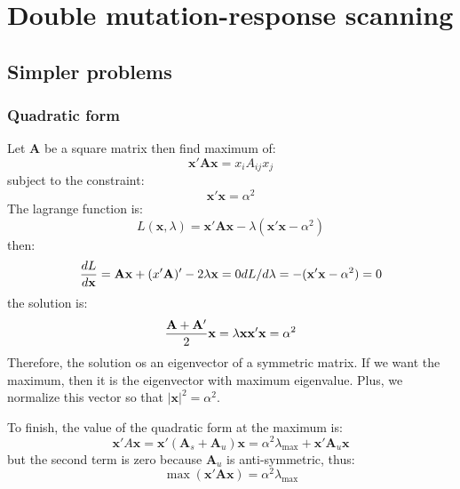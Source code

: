 \documentclass[
]{article}
\author{}
\date{\vspace{-2.5em}}
\begin{document}
\hypertarget{double-mutation-response-scanning}{%
\section{Double mutation-response
scanning}\label{double-mutation-response-scanning}}

\usepackage{amsmath}

\renewcommand{\[}{\begin{equation}}
\renewcommand{\]}{\end{equation}}

\newcommand{\fvec}{\mathbf{f}}
\newcommand{\evec}{\mathbf{e}}
\newcommand{\avec}{\mathbf{a}}
\newcommand{\amat}{\mathbf{A}}
\newcommand{\umat}{\mathbf{U}}
\newcommand{\kmat}{\mathbf{K}}
\newcommand{\cmat}{\mathbf{C}}
\newcommand{\bmat}{\mathbf{B}}
\newcommand{\vvec}{\mathbf{v}}
\newcommand{\uvec}{\mathbf{u}}
\newcommand{\x}{\mathbf{x}}
\newcommand{\y}{\mathbf{y}}

\hypertarget{simpler-problems}{%
\subsection{Simpler problems}\label{simpler-problems}}

\hypertarget{quadratic-form}{%
\subsubsection{Quadratic form}\label{quadratic-form}}

Let \(\mathbf{A}\) be a square matrix then find maximum of: \[
\mathbf{x}'\mathbf{A}\mathbf{x}= x_iA_{ij}x_j
\] subject to the constraint: \[
\mathbf{x}'\mathbf{x}= \alpha^2
\] The lagrange function is: \[
L(\mathbf{x},\lambda) = \mathbf{x}'\mathbf{A}\mathbf{x}- \lambda (\mathbf{x}'\mathbf{x}-\alpha^2)
\] then: \[
 \frac{dL}{d\mathbf{x}} = \mathbf{A}\mathbf{x}+(x'\mathbf{A})'-2\lambda\mathbf{x}= 0  \\
  dL/d\lambda = -(\mathbf{x}'\mathbf{x}- \alpha^2) = 0
\] the solution is: \[
\frac{\mathbf{A}+ \mathbf{A}'}{2}\mathbf{x}=\lambda\mathbf{x}\\
\mathbf{x}'\mathbf{x}= \alpha^2
\] Therefore, the solution os an eigenvector of a symmetric matrix. If
we want the maximum, then it is the eigenvector with maximum eigenvalue.
Plus, we normalize this vector so that \(|\mathbf{x}|^2 = \alpha^2\).

To finish, the value of the quadratic form at the maximum is: \[
\mathbf{x}'A\mathbf{x}=\mathbf{x}'(\mathbf{A}_s+\mathbf{A}_u)\mathbf{x}= \alpha^2\lambda_{\max}+\mathbf{x}'\mathbf{A}_u\mathbf{x}
\] but the second term is zero because \(\mathbf{A}_u\) is
anti-symmetric, thus: \[
\max(\mathbf{x}'\mathbf{A}\mathbf{x}) = \alpha^2\lambda_\max \label{xAx_max}
\]
\end{document}
